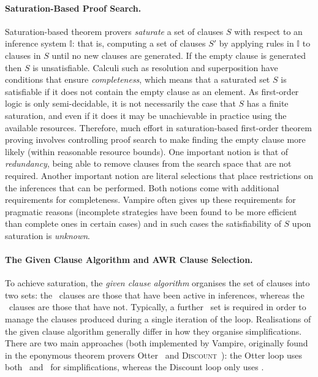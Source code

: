 \documentclass{llncs}
\begin{document}
\paragraph{Saturation-Based Proof Search.}
Saturation-based theorem provers \emph{saturate} a set of clauses $S$ with respect to an inference system $\mathbb{I}$: that is, computing a set of clauses $S'$ by applying rules in $\mathbb{I}$ to clauses in $S$ until no new clauses are generated. 
If the empty clause is generated then $S$ is unsatisfiable.
Calculi such as resolution and superposition have conditions that ensure \emph{completeness}, which means that a saturated set $S$ is satisfiable if it does not contain the empty clause as an element.
As first-order logic is only semi-decidable, it is not necessarily the case that $S$ has a finite saturation, and even if it does it may be unachievable in practice using the available resources. 
Therefore, much effort in saturation-based first-order theorem proving involves 
controlling proof search to make finding the empty clause more likely (within reasonable resource bounds). 
One important notion is that of \emph{redundancy}, being able to remove clauses from the search space that are not required. 
Another important notion are literal selections that place restrictions on the inferences that can be performed. 
Both notions come with additional requirements for completeness. Vampire often gives up these requirements for pragmatic reasons (incomplete strategies have been found to be more efficient than complete ones in certain cases) and in such cases the satisfiability of $S$ upon saturation is \emph{unknown}.

\paragraph{The Given Clause Algorithm and AWR Clause Selection.}
To achieve saturation, the \emph{given clause algorithm} organises the set of clauses into two sets: the \Active\ clauses are those that have been active in inferences, whereas the \Passive\ clauses are those that have not. Typically, a further \Unprocessed\ set is required in order to manage the clauses produced during a single iteration of the loop. 
Realisations of the given clause algorithm generally differ in how they organise simplifications. There are two main approaches (both implemented by Vampire, originally found in the eponymous theorem provers Otter~\cite{otter} and \textsc{Discount}~\cite{discount}): the Otter loop uses both \Active\ and \Passive\ for simplifications, whereas the Discount loop only uses \Active. 
\end{document}
